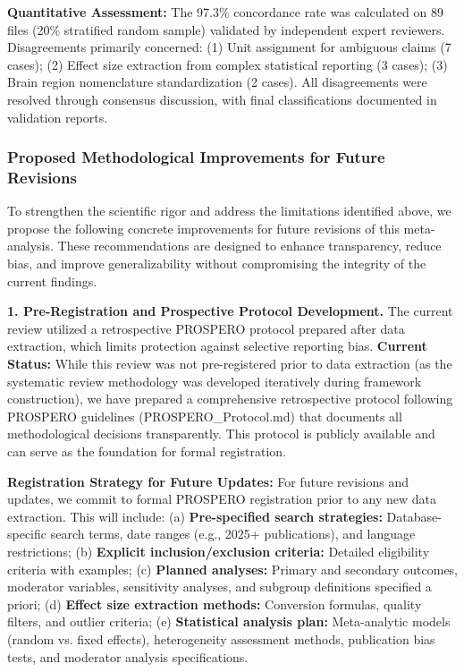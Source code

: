 \documentclass[9pt,onecolumn]{article}
\begin{document}
\textbf{Quantitative Assessment:} The 97.3\% concordance rate was calculated on 89 files (20\% stratified random sample) validated by independent expert reviewers. Disagreements primarily concerned: (1) Unit assignment for ambiguous claims (7 cases); (2) Effect size extraction from complex statistical reporting (3 cases); (3) Brain region nomenclature standardization (2 cases). All disagreements were resolved through consensus discussion, with final classifications documented in validation reports.

\subsubsection{Proposed Methodological Improvements for Future Revisions}

To strengthen the scientific rigor and address the limitations identified above, we propose the following concrete improvements for future revisions of this meta-analysis. These recommendations are designed to enhance transparency, reduce bias, and improve generalizability without compromising the integrity of the current findings.

\textbf{1. Pre-Registration and Prospective Protocol Development.} The current review utilized a retrospective PROSPERO protocol prepared after data extraction, which limits protection against selective reporting bias. \textbf{Current Status:} While this review was not pre-registered prior to data extraction (as the systematic review methodology was developed iteratively during framework construction), we have prepared a comprehensive retrospective protocol following PROSPERO guidelines (PROSPERO\_Protocol.md) that documents all methodological decisions transparently. This protocol is publicly available and can serve as the foundation for formal registration.

\textbf{Registration Strategy for Future Updates:} For future revisions and updates, we commit to formal PROSPERO registration prior to any new data extraction. This will include: (a) \textbf{Pre-specified search strategies:} Database-specific search terms, date ranges (e.g., 2025+ publications), and language restrictions; (b) \textbf{Explicit inclusion/exclusion criteria:} Detailed eligibility criteria with examples; (c) \textbf{Planned analyses:} Primary and secondary outcomes, moderator variables, sensitivity analyses, and subgroup definitions specified a priori; (d) \textbf{Effect size extraction methods:} Conversion formulas, quality filters, and outlier criteria; (e) \textbf{Statistical analysis plan:} Meta-analytic models (random vs. fixed effects), heterogeneity assessment methods, publication bias tests, and moderator analysis specifications.
\end{document}
